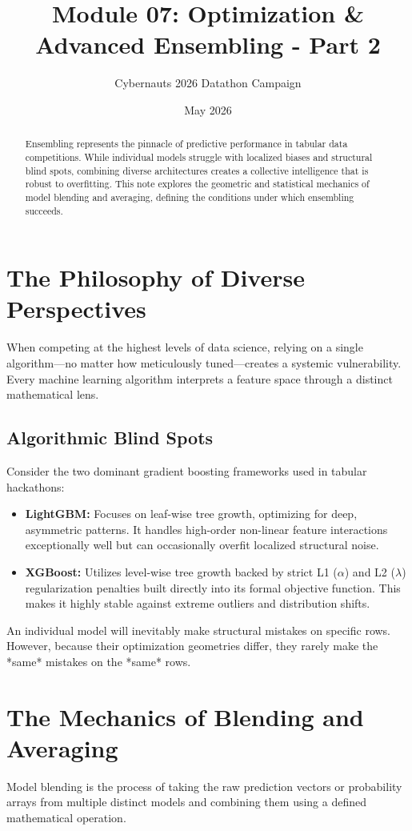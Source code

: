 \documentclass{article}
\title{Module 07: Optimization \& Advanced Ensembling - Part 2}
\author{Cybernauts 2026 Datathon Campaign}
\date{May 2026}
\begin{document}
\maketitle

\begin{abstract}
Ensembling represents the pinnacle of predictive performance in tabular data competitions. While individual models struggle with localized biases and structural blind spots, combining diverse architectures creates a collective intelligence that is robust to overfitting. This note explores the geometric and statistical mechanics of model blending and averaging, defining the conditions under which ensembling succeeds.
\end{abstract}

\tableofcontents
\newpage

\section{The Philosophy of Diverse Perspectives}
When competing at the highest levels of data science, relying on a single algorithm—no matter how meticulously tuned—creates a systemic vulnerability. Every machine learning algorithm interprets a feature space through a distinct mathematical lens.

\subsection{Algorithmic Blind Spots}
Consider the two dominant gradient boosting frameworks used in tabular hackathons:
\begin{itemize}
    \item \textbf{LightGBM:} Focuses on leaf-wise tree growth, optimizing for deep, asymmetric patterns. It handles high-order non-linear feature interactions exceptionally well but can occasionally overfit localized structural noise.
    \item \textbf{XGBoost:} Utilizes level-wise tree growth backed by strict L1 ($\alpha$) and L2 ($\lambda$) regularization penalties built directly into its formal objective function. This makes it highly stable against extreme outliers and distribution shifts.
\end{itemize}

An individual model will inevitably make structural mistakes on specific rows. However, because their optimization geometries differ, they rarely make the *same* mistakes on the *same* rows.

\section{The Mechanics of Blending and Averaging}
Model blending is the process of taking the raw prediction vectors or probability arrays from multiple distinct models and combining them using a defined mathematical operation.
\end{document}
